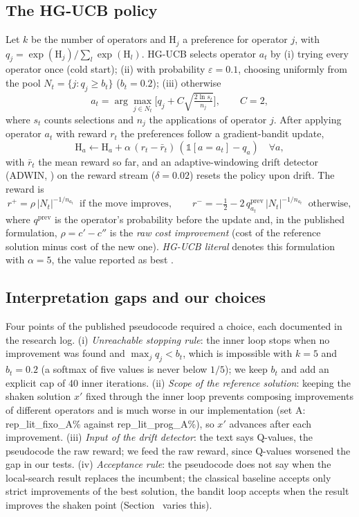\subsection{The HG-UCB policy}\label{sec:hgucb}
Let $k$ be the number of operators and $\mathrm{H}_j$ a preference for operator $j$, with $q_j=\exp(\mathrm{H}_j)/\sum_l\exp(\mathrm{H}_l)$. HG-UCB selects operator $a_t$ by (i) trying every operator once (cold start); (ii) with probability $\varepsilon=0.1$, choosing uniformly from the pool $N_t=\{j:q_j\ge b_t\}$ ($b_t=0.2$); (iii) otherwise
\begin{equation}
a_t=\arg\max_{j\in N_t}\Big[q_j+C\sqrt{\tfrac{2\ln s_t}{n_j}}\Big],\qquad C=2,
\end{equation}
where $s_t$ counts selections and $n_j$ the applications of operator $j$. After applying operator $a_t$ with reward $r_t$ the preferences follow a gradient-bandit update,
\begin{equation}
\mathrm{H}_{a}\leftarrow \mathrm{H}_{a}+\alpha\,(r_t-\bar r_t)\,(\mathbb{1}[a=a_t]-q_a)\quad\forall a,
\end{equation}
with $\bar r_t$ the mean reward so far, and an adaptive-windowing drift detector (ADWIN, \citealp{bifet2007}) on the reward stream ($\delta=0.02$) resets the policy upon drift. The reward is
\begin{equation}
r^{+}=\rho\,|N_t|^{-1/n_{a_t}}\ \text{ if the move improves},\qquad r^{-}=-\tfrac12-2\,q_{a_t}^{\mathrm{prev}}\,|N_t|^{-1/n_{a_t}}\ \text{ otherwise},
\end{equation}
where $q^{\mathrm{prev}}$ is the operator's probability before the update and, in the published formulation, $\rho=c'-c''$ is the \emph{raw cost improvement} (cost of the reference solution minus cost of the new one). \emph{HG-UCB literal} denotes this formulation with $\alpha=5$, the value reported as best \citep{kalatzantonakis2023}.

\subsection{Interpretation gaps and our choices}\label{sec:gaps}
Four points of the published pseudocode required a choice, each documented in the research log. (i) \emph{Unreachable stopping rule}: the inner loop stops when no improvement was found and $\max_jq_j<b_t$, which is impossible with $k=5$ and $b_t=0.2$ (a softmax of five values is never below $1/5$); we keep $b_t$ and add an explicit cap of 40 inner iterations. (ii) \emph{Scope of the reference solution}: keeping the shaken solution $x'$ fixed through the inner loop prevents composing improvements of different operators and is much worse in our implementation (set A: \num{rep_lit_fixo_A}\% against \num{rep_lit_prog_A}\%), so $x'$ advances after each improvement. (iii) \emph{Input of the drift detector}: the text says Q-values, the pseudocode the raw reward; we feed the raw reward, since Q-values worsened the gap in our tests. (iv) \emph{Acceptance rule}: the pseudocode does not say when the local-search result replaces the incumbent; the classical baseline accepts only strict improvements of the best solution, the bandit loop accepts when the result improves the shaken point (Section~ varies this).

